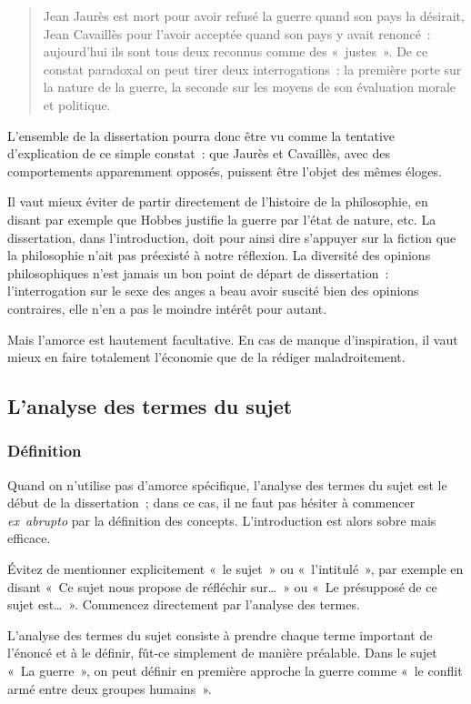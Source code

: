 \documentclass[a4paper]{article}
\begin{document}
\begin{quote}
Jean Jaurès est mort pour avoir refusé la guerre quand son pays la
désirait, Jean Cavaillès pour l'avoir acceptée quand son pays y avait
renoncé : aujourd'hui ils sont tous deux reconnus comme des « justes ».
De ce constat paradoxal on peut tirer deux interrogations : la
première porte sur la nature de la guerre, la seconde sur les moyens
de son évaluation morale et politique.
\end{quote}

L'ensemble de la dissertation pourra donc être vu comme la tentative
d'explication de ce simple constat : que Jaurès et Cavaillès, avec des
comportements apparemment opposés, puissent être l'objet des mêmes
éloges.

Il vaut mieux éviter de partir directement de l'histoire de la
philosophie, en disant par exemple que Hobbes justifie la guerre par
l'état de nature, etc. La dissertation, dans l'introduction, doit pour
ainsi dire s'appuyer sur la fiction que la philosophie n'ait pas
préexisté à notre réflexion. La diversité des opinions philosophiques
n'est jamais un bon point de départ de dissertation : l'interrogation
sur le sexe des anges a beau avoir suscité bien des opinions contraires,
elle n'en a pas le moindre intérêt pour autant.

Mais l'amorce est hautement facultative. En cas de manque d'inspiration,
il vaut mieux en faire totalement l'économie que de la rédiger
maladroitement.
\subsection{L'analyse des termes du sujet}
\label{sec-2-2}
\subsubsection{Définition}
\label{sec-2-2-1}


Quand on n'utilise pas d'amorce spécifique, l'analyse des termes du
sujet est le début de la dissertation ; dans ce cas, il ne faut pas
hésiter à commencer \emph{ex abrupto} par la définition des concepts.
L'introduction est alors sobre mais efficace.

Évitez de mentionner explicitement « le sujet » ou « l'intitulé », par
exemple en disant « Ce sujet nous propose de réfléchir sur\ldots{} » ou « Le
présupposé de ce sujet est\ldots{} ». Commencez directement par l'analyse des
termes.

L'analyse des termes du sujet consiste à prendre chaque terme important
de l'énoncé et à le définir, fût-ce simplement de manière préalable.
Dans le sujet « La guerre », on peut définir en première approche la
guerre comme « le conflit armé entre deux groupes humains ».
\end{document}
